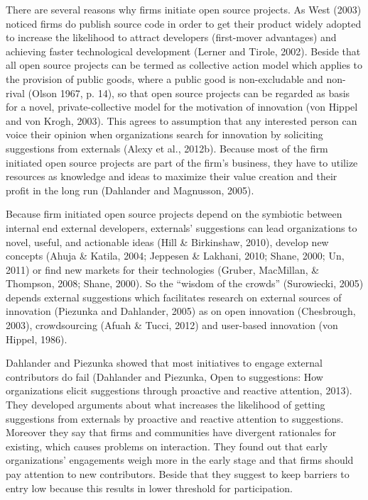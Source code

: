 There are several reasons why firms initiate open source projects. As West (2003) noticed firms do publish source code in order to get their product widely adopted to increase the likelihood to attract developers (first-mover advantages) and achieving faster technological development (Lerner and Tirole, 2002). Beside that all open source projects can be termed as collective action model which applies to the provision of public goods, where a public good is non-excludable and non-rival (Olson 1967, p. 14), so that open source projects can be regarded as basis for a novel, private-collective model for the motivation of innovation (von Hippel and von Krogh, 2003). This agrees to assumption that any interested person can voice their opinion when organizations search for innovation by soliciting suggestions from externals (Alexy et al., 2012b). Because most of the firm initiated open source projects are part of the firm's business, they have to utilize resources as knowledge and ideas to maximize their value creation and their profit in the long run (Dahlander and Magnusson, 2005).

Because firm initiated open source projects depend on the symbiotic between internal end external developers, externals’ suggestions can lead organizations to novel, useful, and actionable ideas (Hill \& Birkinshaw, 2010), develop new concepts (Ahuja \& Katila, 2004; Jeppesen \& Lakhani, 2010; Shane, 2000; Un, 2011) or find new markets for their technologies (Gruber, MacMillan, \& Thompson, 2008; Shane, 2000). So the “wisdom of the crowds” (Surowiecki, 2005) depends external suggestions which facilitates research on external sources of innovation (Piezunka and Dahlander, 2005) as on open innovation (Chesbrough, 2003), crowdsourcing (Afuah \& Tucci, 2012) and user-based innovation (von Hippel, 1986).

Dahlander and Piezunka showed that most initiatives to engage external contributors do fail (Dahlander and Piezunka, Open to suggestions: How organizations elicit suggestions through proactive and reactive attention, 2013). They developed arguments about what increases the likelihood of getting suggestions from externals by proactive and reactive attention to suggestions. Moreover they say that firms and communities have divergent rationales for existing, which causes problems on interaction.
They found out that early organizations’ engagements weigh more in the early stage and that firms should pay attention to new contributors. Beside that they suggest to keep barriers to entry low because this results in lower threshold for participation.

